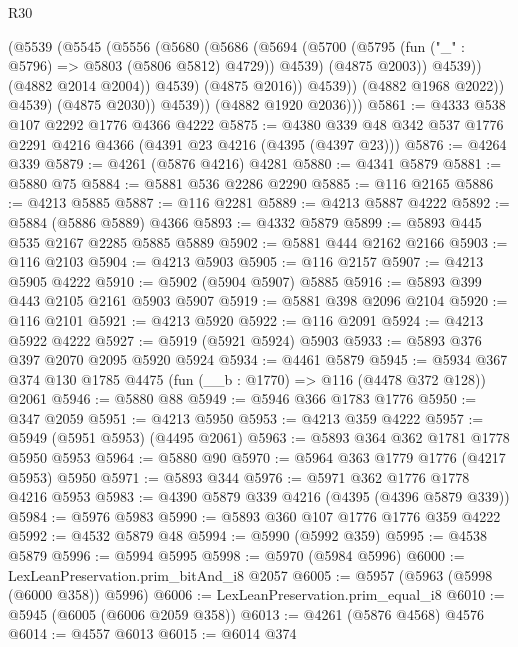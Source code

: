 \begin{lexlean}{R30}
\begin{coremodule}
                      (@5539
                        (@5545
                          (@5556
                            (@5680
                              (@5686
                                (@5694
                                  (@5700
                                    (@5795 (fun ("_" : @5796) => @5803 (@5806 @5812) @4729))
                                    @4539)
                                  (@4875 @2003))
                                @4539))
                            (@4882 @2014 @2004))
                          @4539)
                        (@4875 @2016))
                      @4539))
                  (@4882 @1968 @2022))
                @4539)
              (@4875 @2030))
            @4539))
        (@4882 @1920 @2036)))
@5861 := @4333 @538 @107 @2292 @1776 @4366 @4222
@5875 := @4380 @339 @48 @342 @537 @1776 @2291 @4216 @4366 (@4391 @23 @4216 (@4395 (@4397 @23)))
@5876 := @4264 @339
@5879 := @4261 (@5876 @4216) @4281
@5880 := @4341 @5879
@5881 := @5880 @75
@5884 := @5881 @536 @2286 @2290
@5885 := @116 @2165
@5886 := @4213 @5885
@5887 := @116 @2281
@5889 := @4213 @5887 @4222
@5892 := @5884 (@5886 @5889) @4366
@5893 := @4332 @5879
@5899 := @5893 @445 @535 @2167 @2285 @5885 @5889
@5902 := @5881 @444 @2162 @2166
@5903 := @116 @2103
@5904 := @4213 @5903
@5905 := @116 @2157
@5907 := @4213 @5905 @4222
@5910 := @5902 (@5904 @5907) @5885
@5916 := @5893 @399 @443 @2105 @2161 @5903 @5907
@5919 := @5881 @398 @2096 @2104
@5920 := @116 @2101
@5921 := @4213 @5920
@5922 := @116 @2091
@5924 := @4213 @5922 @4222
@5927 := @5919 (@5921 @5924) @5903
@5933 := @5893 @376 @397 @2070 @2095 @5920 @5924
@5934 := @4461 @5879
@5945 := @5934 @367 @374 @130 @1785 @4475 (fun (__b : @1770) => @116 (@4478 @372 @128)) @2061
@5946 := @5880 @88
@5949 := @5946 @366 @1783 @1776
@5950 := @347 @2059
@5951 := @4213 @5950
@5953 := @4213 @359 @4222
@5957 := @5949 (@5951 @5953) (@4495 @2061)
@5963 := @5893 @364 @362 @1781 @1778 @5950 @5953
@5964 := @5880 @90
@5970 := @5964 @363 @1779 @1776 (@4217 @5953) @5950
@5971 := @5893 @344
@5976 := @5971 @362 @1776 @1778 @4216 @5953
@5983 := @4390 @5879 @339 @4216 (@4395 (@4396 @5879 @339))
@5984 := @5976 @5983
@5990 := @5893 @360 @107 @1776 @1776 @359 @4222
@5992 := @4532 @5879 @48
@5994 := @5990 (@5992 @359)
@5995 := @4538 @5879
@5996 := @5994 @5995
@5998 := @5970 (@5984 @5996)
@6000 := LexLeanPreservation.prim_bitAnd_i8 @2057
@6005 := @5957 (@5963 (@5998 (@6000 @358)) @5996)
@6006 := LexLeanPreservation.prim_equal_i8
@6010 := @5945 (@6005 (@6006 @2059 @358))
@6013 := @4261 (@5876 @4568) @4576
@6014 := @4557 @6013
@6015 := @6014 @374

\end{coremodule}
\end{lexlean}
